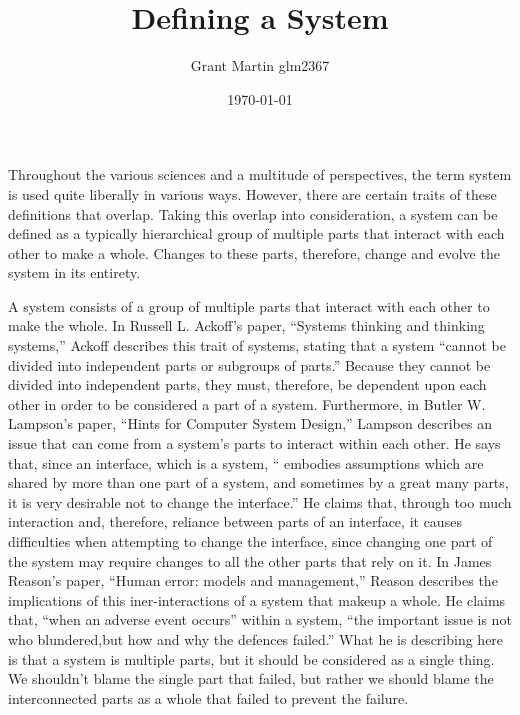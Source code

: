 \documentclass[11pt]{article}
\title{Defining a System}
\author{Grant Martin glm2367}
\date{\today}
\begin{document}
\maketitle

Throughout the various sciences and a multitude of perspectives, the term system is used quite liberally in various ways. However, there are certain traits of these definitions that overlap. Taking this overlap into consideration, a system can be defined as a typically hierarchical group of multiple parts that interact with each other to make a whole. Changes to these parts, therefore, change and evolve the system in its entirety. 
\par A system consists of a group of multiple parts that interact with each other to make the whole. In Russell  L.  Ackoff’s paper, ``Systems thinking and thinking systems,'' Ackoff describes this trait of systems, stating that a system ``cannot be divided  into  independent  parts  or subgroups  of parts.''\cite{ackoff:1994} Because they cannot be divided into independent parts, they must, therefore, be dependent upon each other in order to be considered a part of a system. Furthermore, in Butler W. Lampson’s paper, ``Hints for Computer System Design,'' Lampson describes an issue that can come from a system’s parts to interact within each other. He says that, since an interface, which is a system, `` embodies assumptions which are shared by more than one part of a system, and sometimes by a great many parts, it is very desirable not to change the interface.''\cite{lampson:1983} He claims that, through too much interaction and, therefore, reliance between parts of an interface, it causes difficulties when attempting to change the interface, since changing one part of the system may require changes to all the other parts that rely on it. In James Reason’s paper, ``Human error: models and management,'' Reason describes the implications of this iner-interactions of a system that makeup a whole. He claims that, ``when an adverse event occurs'' within a system, ``the important issue is not who blundered,but how and why the defences failed.''\cite{reason:2000} What he is describing here is that a system is multiple parts, but it should be considered as a single thing. We shouldn't blame the single part that failed, but rather we should blame the interconnected parts as a whole that failed to prevent the failure.
\end{document}
